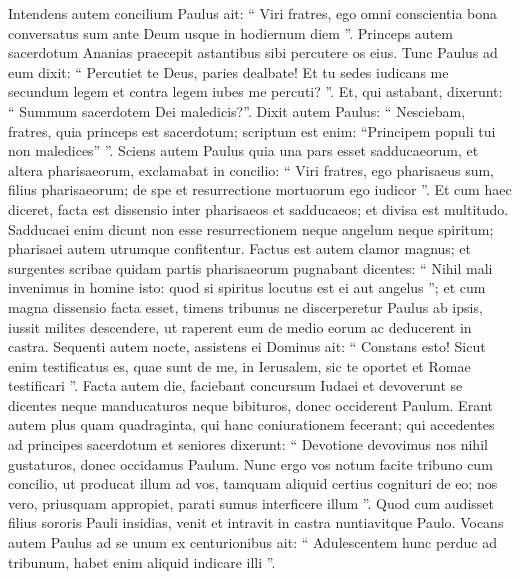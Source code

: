 \begin{biblechapter}
\begin{biblechapter}
\begin{biblechapter}
\begin{biblechapter}
\begin{biblechapter}
\begin{biblechapter}
\begin{biblechapter}
\begin{biblechapter}
\begin{biblechapter}
\begin{biblechapter}
\begin{biblechapter}
\begin{biblechapter}
\begin{biblechapter}
\begin{biblechapter}
\begin{biblechapter}
\begin{biblechapter}
\begin{biblechapter}
\begin{biblechapter}
\begin{biblechapter}
\begin{biblechapter}
\begin{biblechapter}
\begin{biblechapter}
\begin{biblechapter}
\verse Intendens autem concilium Paulus ait: “ Viri fratres, ego omni conscientia bona conversatus sum ante Deum usque in hodiernum diem ”. 
\verse Princeps autem sacerdotum Ananias praecepit astantibus sibi percutere os eius. 
 \verse Tunc Paulus ad eum dixit: “ Percutiet te Deus, paries dealbate! Et tu sedes iudicans me secundum legem et contra legem iubes me percuti? ”. 
\verse Et, qui astabant, dixerunt: “ Summum sacerdotem Dei maledicis?”. 
\verse Dixit autem Paulus: “ Nesciebam, fratres, quia princeps est sacerdotum; scriptum est enim: “Principem populi tui non maledices” ”.
 \verse Sciens autem Paulus quia una pars esset sadducaeorum, et altera pharisaeorum, exclamabat in concilio: “ Viri fratres, ego pharisaeus sum, filius pharisaeorum; de spe et resurrectione mortuorum ego iudicor ”. 
\verse Et cum haec diceret, facta est dissensio inter pharisaeos et sadducaeos; et divisa est multitudo. 
 \verse Sadducaei enim dicunt non esse resurrectionem neque angelum neque spiritum; pharisaei autem utrumque confitentur. 
\verse Factus est autem clamor magnus; et surgentes scribae quidam partis pharisaeorum pugnabant dicentes: “ Nihil mali invenimus in homine isto: quod si spiritus locutus est ei aut angelus ”; 
\verse et cum magna dissensio facta esset, timens tribunus ne discerperetur Paulus ab ipsis, iussit milites descendere, ut raperent eum de medio eorum ac deducerent in castra. 
\verse Sequenti autem nocte, assistens ei Dominus ait: “ Constans esto! Sicut enim testificatus es, quae sunt de me, in Ierusalem, sic te oportet et Romae testificari ”.
 \verse Facta autem die, faciebant concursum Iudaei et devoverunt se dicentes neque manducaturos neque bibituros, donec occiderent Paulum. 
\verse Erant autem plus quam quadraginta, qui hanc coniurationem fecerant; 
\verse qui accedentes ad principes sacerdotum et seniores dixerunt: “ Devotione devovimus nos nihil gustaturos, donec occidamus Paulum. 
\verse Nunc ergo vos notum facite tribuno cum concilio, ut producat illum ad vos, tamquam aliquid certius cognituri de eo; nos vero, priusquam appropiet, parati sumus interficere illum ”.
 \verse Quod cum audisset filius sororis Pauli insidias, venit et intravit in castra nuntiavitque Paulo. 
\verse Vocans autem Paulus ad se unum ex centurionibus ait: “ Adulescentem hunc perduc ad tribunum, habet enim aliquid indicare illi ”. 

\end{biblechapter}
\end{biblechapter}
\end{biblechapter}
\end{biblechapter}
\end{biblechapter}
\end{biblechapter}
\end{biblechapter}
\end{biblechapter}
\end{biblechapter}
\end{biblechapter}
\end{biblechapter}
\end{biblechapter}
\end{biblechapter}
\end{biblechapter}
\end{biblechapter}
\end{biblechapter}
\end{biblechapter}
\end{biblechapter}
\end{biblechapter}
\end{biblechapter}
\end{biblechapter}
\end{biblechapter}
\end{biblechapter}
